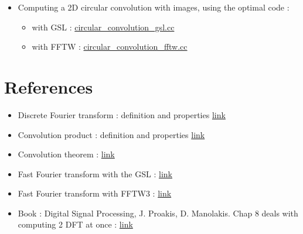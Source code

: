 \documentclass[a4paper,10pt,twoside]{article}
\begin{document}
\begin{itemize}
\begin{itemize}
\end{itemize}
\item  Computing a 2D circular convolution with images, using the optimal code :
\begin{itemize}
\item with GSL : \href{http://jeremy.fix.Free.Fr/Software/Convolution/circular_convolution_gsl.cc}{circular\_convolution\_gsl.cc}
\item with FFTW : \href{http://jeremy.fix.Free.Fr/Software/Convolution/circular_convolution_fftw.cc}{circular\_convolution\_fftw.cc}
\end{itemize}
\end{itemize}


\section{References}

\begin{itemize}
\item Discrete Fourier transform : definition and properties \href{http://en.wikipedia.org/wiki/Discrete_Fourier_transform}{link}
\item Convolution product : definition and properties \href{http://en.wikipedia.org/wiki/Convolution}{link}
\item Convolution theorem : \href{http://en.wikipedia.org/wiki/Convolution_theorem}{link}
\item Fast Fourier transform with the GSL : \href{http://www.gnu.org/software/gsl/manual/html_node/Fast-Fourier-Transforms.html}{link}
\item Fast Fourier transform with FFTW3 : \href{http://www.fftw.org/fftw3_doc}{link}
\item Book : Digital Signal Processing, J. Proakis, D. Manolakis. Chap 8 deals with computing 2 DFT at once : \href{http://www.amazon.com/Digital-Signal-Processing-John-Proakis/dp/0131873741}{link}
\end{itemize}


\clearpage
\end{document}
